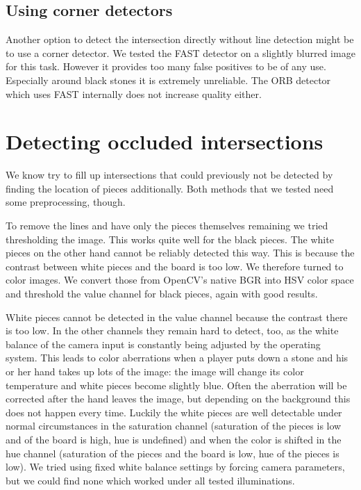 	\subsection{Using corner detectors}
	\label{detector-visible-corners}
	Another option to detect the intersection directly without line detection might be to use a corner detector. We tested the FAST \cite{rosten2006machine} detector on a slightly blurred image for this task. However it provides too many false positives to be of any use. Especially around black stones it is extremely unreliable. The ORB detector which uses FAST internally does not increase quality either.

	\section{Detecting occluded intersections}
	We know try to fill up intersections that could previously not be detected by finding the location of pieces additionally. Both methods that we tested need some preprocessing, though.

	To remove the lines and have only the pieces themselves remaining we tried thresholding the image. This works quite well for the black pieces. The white pieces on the other hand cannot be reliably detected this way. This is because the contrast between white pieces and the board is too low. We therefore turned to color images. We convert those from OpenCV's native BGR into HSV color space and threshold the value channel for black pieces, again with good results.

	White pieces cannot be detected in the value channel because the contrast there is too low. In the other channels they remain hard to detect, too, as the white balance of the camera input is constantly being adjusted by the operating system. This leads to color aberrations when a player puts down a stone and his or her hand takes up lots of the image: the image will change its color temperature and white pieces become slightly blue. Often the aberration will be corrected after the hand leaves the image, but depending on the background this does not happen every time. Luckily the white pieces are well detectable under normal circumstances in the saturation channel (saturation of the pieces is low and of the board is high, hue is undefined) and when the color is shifted in the hue channel (saturation of the pieces and the board is low, hue of the pieces is low). We tried using fixed white balance settings by forcing camera parameters, but we could find none which worked under all tested illuminations.

